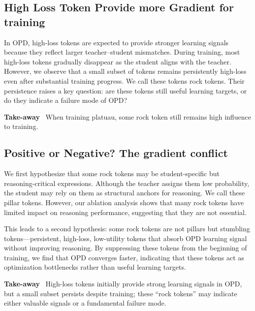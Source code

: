 
\subsection{High Loss Token Provide more Gradient for training}

In OPD, high-loss tokens are expected to provide stronger learning signals because they reflect larger teacher–student mismatches. During training, most high-loss tokens gradually disappear as the student aligns with the teacher. However, we observe that a small subset of tokens remains persistently high-loss even after substantial training progress. We call these tokens rock tokens. Their persistence raises a key question: are these tokens still useful learning targets, or do they indicate a failure mode of OPD?


\begin{takeaway}
\textcolor{tabblue}{\textbf{Take-away}}~
When training platuau, some rock token still remains high influence to training.
\end{takeaway}

\subsection{Positive or Negative? The gradient conflict}


We first hypothesize that some rock tokens may be student-specific but reasoning-critical expressions. Although the teacher assigns them low probability, the student may rely on them as structural anchors for reasoning. We call these pillar tokens. However, our ablation analysis shows that many rock tokens have limited impact on reasoning performance, suggesting that they are not essential.

This leads to a second hypothesis: some rock tokens are not pillars but stumbling tokens—persistent, high-loss, low-utility tokens that absorb OPD learning signal without improving reasoning. By suppressing these tokens from the beginning of training, we find that OPD converges faster, indicating that these tokens act as optimization bottlenecks rather than useful learning targets.

\begin{takeaway}
\textcolor{tabblue}{\textbf{Take-away}}~
High-loss tokens initially provide strong learning signals in OPD, but a small subset persists despite training; these “rock tokens” may indicate either valuable signals or a fundamental failure mode.
\end{takeaway}